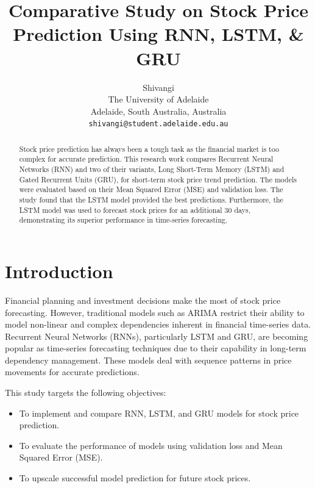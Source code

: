 \documentclass[10pt,twocolumn,a4paper]{article}
\begin{document}
\title{Comparative Study on Stock Price Prediction Using RNN, LSTM, \& GRU}

\author{
    Shivangi \\
     The University of Adelaide\\
Adelaide, South Australia, Australia\\
{\tt\small shivangi@student.adelaide.edu.au}
}

\date{}
\maketitle

\begin{abstract}
    Stock price prediction has always been a tough task as the financial market is too complex for accurate prediction. This research work compares Recurrent Neural Networks (RNN) and two of their variants, Long Short-Term Memory (LSTM) and Gated Recurrent Units (GRU), for short-term stock price trend prediction. The models were evaluated based on their Mean Squared Error (MSE) and validation loss. The study found that the LSTM model provided the best predictions. Furthermore, the LSTM model was used to forecast stock prices for an additional 30 days, demonstrating its superior performance in time-series forecasting.
\end{abstract}

\section{Introduction}
Financial planning and investment decisions make the most of stock price forecasting. However, traditional models such as ARIMA restrict their ability to model non-linear and complex dependencies inherent in financial time-series data. Recurrent Neural Networks (RNNs), particularly LSTM and GRU, are becoming popular as time-series forecasting techniques due to their capability in long-term dependency management. These models deal with sequence patterns in price movements for accurate predictions.

This study targets the following objectives:
\begin{itemize}
    \item To implement and compare RNN, LSTM, and GRU models for stock price prediction.
    \item To evaluate the performance of models using validation loss and Mean Squared Error (MSE).
    \item To upscale successful model prediction for future stock prices.
\end{itemize}
\end{document}
